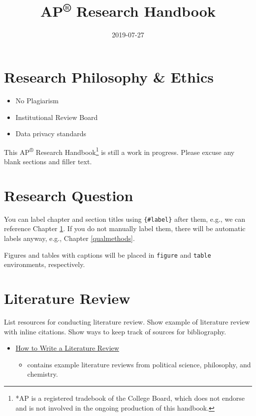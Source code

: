 \documentclass[]{book}
\title{AP\textsuperscript{®} Research Handbook}
\author{}
\date{2019-07-27}
\providecommand{\tightlist}{%
  \setlength{\itemsep}{0pt}\setlength{\parskip}{0pt}}
\let\rmarkdownfootnote\footnote%
\def\footnote{\protect\rmarkdownfootnote}
\begin{document}
\maketitle

{
\setcounter{tocdepth}{1}
\tableofcontents
}
\hypertarget{research-philosophy-ethics}{%
\chapter*{Research Philosophy \& Ethics}\label{research-philosophy-ethics}}

\begin{itemize}
\tightlist
\item
  No Plagiarism
\item
  Institutional Review Board
\item
  Data privacy standards
\end{itemize}

This AP\textsuperscript{®} Research Handbook\footnote{*AP is a registered tradebook of the College Board, which does not endorse and is not involved in the ongoing production of this handbook.} is still a work in progress. Please excuse any blank sections and filler text.

\hypertarget{intro}{%
\chapter{Research Question}\label{intro}}

You can label chapter and section titles using \texttt{\{\#label\}} after them, e.g., we can reference Chapter \ref{intro}. If you do not manually label them, there will be automatic labels anyway, e.g., Chapter \ref{qualmethods}.

Figures and tables with captions will be placed in \texttt{figure} and \texttt{table} environments, respectively.

\hypertarget{literature-review}{%
\chapter{Literature Review}\label{literature-review}}

List resources for conducting literature review.
Show example of literature review with inline citations.
Show ways to keep track of sources for bibliography.

\begin{itemize}
\tightlist
\item
  \href{https://writing.wisc.edu/handbook/assignments/reviewofliterature/}{How to Write a Literature Review}

  \begin{itemize}
  \tightlist
  \item
    contains example literature reviews from political science, philosophy, and chemistry.
  \end{itemize}
\end{itemize}
\end{document}
